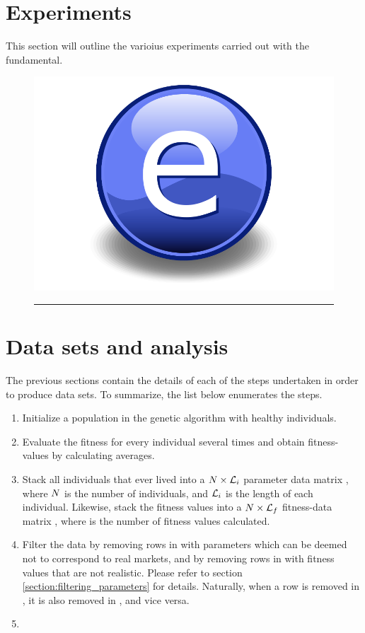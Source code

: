 \section{Experiments}
This section will outline the varioius experiments carried out with the fundamental. 


\begin{figure}[htbp]
	\centering
		\includegraphics{Figures/Electron.pdf}
		\rule{35em}{0.5pt}
	\caption{}
	\label{fig:}
\end{figure}





\section{Data sets and analysis}
The previous sections contain the details of each of the steps undertaken in order to produce data sets. To summarize, the list below enumerates the steps.
\begin{enumerate}
\item Initialize a population in the genetic algorithm with healthy individuals.
\item Evaluate the fitness for every individual several times and obtain fitness-values by calculating averages.
\item Stack all individuals that ever lived into a $N \times \mathcal{L}_i$ parameter data matrix \datamatrixpar, where $N$ is the number of individuals, and $\mathcal{L}_i$ is the length of each individual. Likewise, stack the fitness values into a $N \times \mathcal{L}_f$ fitness-data matrix \datamatrixfit, where \fitnesslength is the number of fitness values calculated. 
\item Filter the data by removing rows in \datamatrixpar with parameters which can be deemed not to correspond to real markets, and by removing rows in \datamatrixfit with fitness values that are not realistic. Please refer to section \ref{section:filtering_parameters} for details. Naturally, when a row is removed in \datamatrixpar, it is also removed in \datamatrixfit, and vice versa. 
\item 
\end{enumerate}

